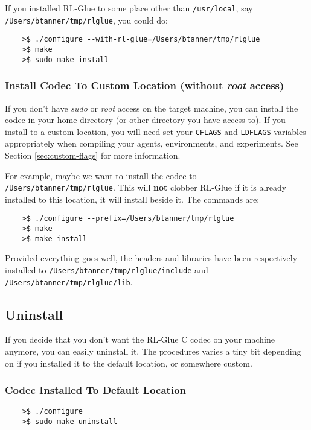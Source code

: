 \documentclass[11pt]{article}
\begin{document}
If you installed RL-Glue to some place other than \texttt{/usr/local}, say \texttt{/Users/btanner/tmp/rlglue}, you could do:
\begin{verbatim}
	>$ ./configure --with-rl-glue=/Users/btanner/tmp/rlglue
	>$ make
	>$ sudo make install
\end{verbatim}

\subsubsection{Install Codec To Custom Location (without \textit{root} access)}
If you don't have \textit{sudo} or \textit{root} access on the target machine, you can install the codec in your home directory (or other directory you have access to).
If you install to a custom location, you will need set your \texttt{CFLAGS} and \texttt{LDFLAGS} variables appropriately when compiling your agents, environments, and experiments. See Section \ref{sec:custom-flags} for more information.

For example, maybe we want to install the codec to \texttt{/Users/btanner/tmp/rlglue}.  This will \textbf{not} clobber RL-Glue if it is already installed to this location, it will install beside it.  The commands are:
\begin{verbatim}
	>$ ./configure --prefix=/Users/btanner/tmp/rlglue
	>$ make
	>$ make install
\end{verbatim}

Provided everything goes well, the headers and libraries have been respectively installed to\newline
\texttt{/Users/btanner/tmp/rlglue/include} and \texttt{/Users/btanner/tmp/rlglue/lib}.


\subsection{Uninstall}
If you decide that you don't want the RL-Glue C codec on your machine anymore, you can easily uninstall it.  The procedures varies a tiny bit depending on if you installed it to the default location, or somewhere custom.

\subsubsection{Codec Installed To Default Location}
\begin{verbatim}
	>$ ./configure
	>$ sudo make uninstall
\end{verbatim}
\end{document}
